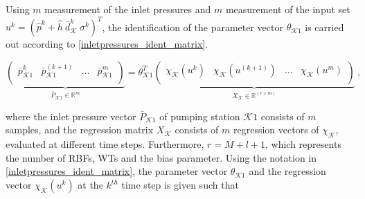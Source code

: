 Using $m$ measurement of the inlet pressures and $m$ measurement of the input set $u^k = ( \hat{p}^{k}\! + \!\hat{h} \ \bar{d}^{k}_{\mathcal{K}} \ \sigma^{k} )^T$, the identification of the parameter vector $\theta_{\mathcal{K}1}$ is carried out according to \eqref{inletpressures_ident_matrix}. 

  \begin{equation}
\label{inletpressures_ident_matrix}
\underbrace{\begin{pmatrix}
           \bar{p}^{k}_{\mathcal{K}1} & \bar{p}^{(k+1)}_{\mathcal{K}1} & \hdots & \bar{p}^{m}_{\mathcal{K}1}\\
         \end{pmatrix}}_{\bar{P}_{\mathcal{K}1}  \in  \mathbb{R}^{m}} 
         = \theta^T_{\mathcal{K}1}    
         \underbrace{\begin{pmatrix}
           \chi_{\mathcal{K}}(u^{k}) & \chi_{\mathcal{K}}(u^{(k+1)}) & \hdots & \chi_{\mathcal{K}}(u^{m})\\
         \end{pmatrix}}_{X_{\mathcal{K}} \in \mathbb{R}^{(r \times m)}} \ ,
\end{equation}

where the inlet pressure vector $\bar{P}_{\mathcal{K}1}$ of pumping station $\mathcal{K}1$ consists of $m$ samples, and the regression matrix $X_{\mathcal{K}}$ consists of $m$ regression vectors of $\chi_{\mathcal{K}}$, evaluated at different time steps. Furthermore, $r = M \!+\! l\! +\! 1$, which represents the number of RBFs, WTs and the bias parameter. Using the notation in \eqref{inletpressures_ident_matrix}, the parameter vector $\theta_{\mathcal{K}1}$ and the regression vector $\chi_{\mathcal{K}}(u^k)$  at the $k^{th}$ time step is given such that

